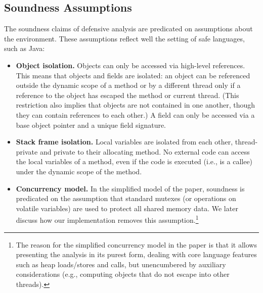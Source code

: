 

\subsection{Soundness Assumptions}
\label{sec:assumptions}

The soundness claims of defensive analysis are predicated on
assumptions about the environment. These assumptions reflect well the
setting of safe languages, such as Java:

\begin{itemize}
\item \textbf{Object isolation.} Objects can only be accessed via
  high-level references. This means that objects and fields are
  isolated: an object can be referenced outside the dynamic scope of a
  method or by a different thread only if a reference to the object
  has escaped the method or current thread. (This restriction also
  implies that objects are not contained in one another, though they
  can contain references to each other.) A field can only be accessed
  via a base object pointer and a unique field signature.
  
\item \textbf{Stack frame isolation.} Local variables are isolated
  from each other, thread-private and private to their allocating
  method. No external code can access the local variables of a method,
  even if the code is executed (i.e., is a callee) under the dynamic
  scope of the method.

\item \textbf{Concurrency model.} In the simplified model of the
  paper, soundness is predicated on the assumption that standard
  mutexes (or operations on volatile variables) are used to protect
  all shared memory data. We later discuss
  how our implementation removes this assumption.\footnote{The reason
    for the simplified concurrency model in the paper is that it
    allows presenting the analysis in its purest form, dealing with
    core language features such as heap loads/stores and calls, but
    unencumbered by auxiliary considerations (e.g., computing objects
    that do not escape into other threads).}
\end{itemize}

